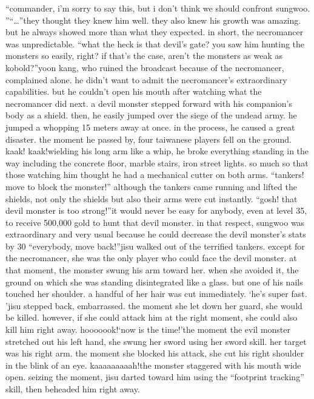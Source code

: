 “commander, i’m sorry to say this, but i don’t think we should confront sungwoo.
”“…”they thought they knew him well.
 they also knew his growth was amazing.
 but he always showed more than what they expected.
in short, the necromancer was unpredictable.
“what the heck is that devil’s gate? you saw him hunting the monsters so easily, right? if that’s the case, aren’t the monsters as weak as kobold?”yoon kang, who ruined the broadcast because of the necromancer, complained alone.
 he didn’t want to admit the necromancer’s extraordinary capabilities.
but he couldn’t open his mouth after watching what the necromancer did next.
a devil monster stepped forward with his companion’s body as a shield.
 then, he easily jumped over the siege of the undead army.
 he jumped a whopping 15 meters away at once.
in the process, he caused a great disaster.
 the moment he passed by, four taiwanese players fell on the ground.
kaak! kaak!wielding his long arm like a whip, he broke everything standing in the way including the concrete floor, marble stairs, iron street lights.
 so much so that those watching him thought he had a mechanical cutter on both arms.
“tankers! move to block the monster!”
although the tankers came running and lifted the shields, not only the shields but also their arms were cut instantly.
“gosh! that devil monster is too strong!”it would never be easy for anybody, even at level 35, to receive 500,000 gold to hunt that devil monster.
in that respect, sungwoo was extraordinary and very usual because he could decrease the devil monster’s stats by 30%
“everybody, move back!”jisu walked out of the terrified tankers.
 except for the necromancer, she was the only player who could face the devil monster.
at that moment, the monster swung his arm toward her.
when she avoided it, the ground on which she was standing disintegrated like a glass.
 but one of his nails touched her shoulder.
 a handful of her hair was cut immediately.
‘he’s super fast.
’jisu stepped back, embarrassed.
 the moment she let down her guard, she would be killed.
 however, if she could attack him at the right moment, she could also kill him right away.
hooooook!‘now is the time!’the moment the evil monster stretched out his left hand, she swung her sword using her sword skill.
 her target was his right arm.
 the moment she blocked his attack, she cut his right shoulder in the blink of an eye.
kaaaaaaaaah!the monster staggered with his mouth wide open.
 seizing the moment, jisu darted toward him using the “footprint tracking” skill, then beheaded him right away.
